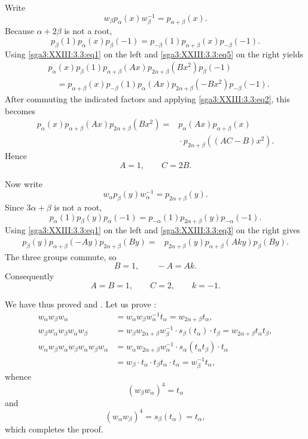 Write
\[
  w_\beta p_\alpha(x)w_\beta^{-1}=p_{\alpha+\beta}(x).
\]
Because \(\alpha+2\beta\) is not a root,
\[
  p_\beta(1)p_\alpha(x)p_\beta(-1)
    =p_{-\beta}(1)p_{\alpha+\beta}(x)p_{-\beta}(-1).
\]
Using \eqref{sga3:XXIII:3.3:eq1} on the left and
\eqref{sga3:XXIII:3.3:eq5} on the right yields
\[
\begin{aligned}
  &p_\alpha(x)p_\beta(1)p_{\alpha+\beta}(Ax)
    p_{2\alpha+\beta}(Bx^2)p_\beta(-1)\\
  &\quad=p_{\alpha+\beta}(x)p_{-\beta}(1)p_\alpha(Ax)
    p_{2\alpha+\beta}(-Bx^2)p_{-\beta}(-1).
\end{aligned}
\]
After commuting the indicated factors and applying
\eqref{sga3:XXIII:3.3:eq2}, this becomes
\[
\begin{aligned}
  p_\alpha(x)p_{\alpha+\beta}(Ax)p_{2\alpha+\beta}(Bx^2)
  ={}&p_\alpha(Ax)p_{\alpha+\beta}(x)\\
     &{}\cdot p_{2\alpha+\beta}((AC-B)x^2).
\end{aligned}
\]
Hence
\[
  A=1,\qquad C=2B.
\]

Now write
\[
  w_\alpha p_\beta(y)w_\alpha^{-1}=p_{2\alpha+\beta}(y).
\]
Since \(3\alpha+\beta\) is not a root,
\[
  p_\alpha(1)p_\beta(y)p_\alpha(-1)
    =p_{-\alpha}(1)p_{2\alpha+\beta}(y)p_{-\alpha}(-1).
\]
Using \eqref{sga3:XXIII:3.3:eq1} on the left and
\eqref{sga3:XXIII:3.3:eq3} on the right gives
\[
\begin{aligned}
  p_\beta(y)p_{\alpha+\beta}(-Ay)p_{2\alpha+\beta}(By)
  ={}&p_{2\alpha+\beta}(y)p_{\alpha+\beta}(Aky)p_\beta(By).
\end{aligned}
\]
The three groups commute, so
\[
  B=1,\qquad -A=Ak.
\]
Consequently
\[
  A=B=1,\qquad C=2,\qquad k=-1.
\]

We have thus proved  and . Let us prove
:
\[
\begin{aligned}
  w_\alpha w_\beta w_\alpha
    &=w_\alpha w_\beta w_\alpha^{-1}t_\alpha=w_{2\alpha+\beta}t_\alpha,\\
  w_\beta w_\alpha w_\beta w_\alpha w_\beta
    &=w_\beta w_{2\alpha+\beta}w_\beta^{-1}\cdot s_\beta(t_\alpha)\cdot t_\beta
     =w_{2\alpha+\beta}t_\alpha t_\beta,\\
  w_\alpha w_\beta w_\alpha w_\beta w_\alpha w_\beta w_\alpha
    &=w_\alpha w_{2\alpha+\beta}w_\alpha^{-1}\cdot s_\alpha(t_\alpha t_\beta)\cdot t_\alpha\\
    &=w_\beta\cdot t_\alpha\cdot t_\beta t_\alpha\cdot t_\alpha
     =w_\beta^{-1}t_\alpha,
\end{aligned}
\]
whence
\[
  (w_\beta w_\alpha)^4=t_\alpha
\]
and
\[
  (w_\alpha w_\beta)^4=s_\beta(t_\alpha)=t_\alpha,
\]
which completes the proof.

